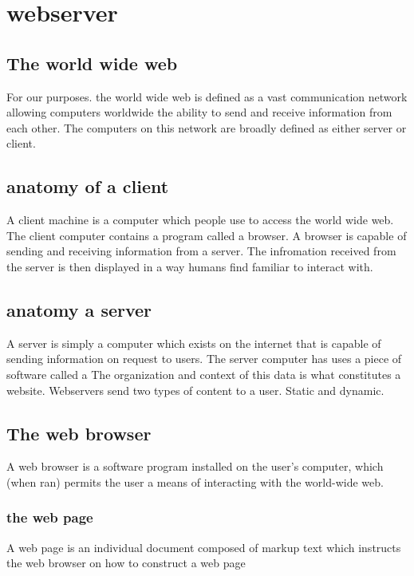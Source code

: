 \section{webserver}

\subsection{The world wide web}

For our purposes. the world wide web is defined as a vast communication network allowing computers worldwide the ability to send and receive information from each other.  The computers on this network are broadly defined as either server or client.

\subsection{anatomy of a client}

A client machine is a computer which people use to access the world wide web.  The client computer contains a program called a browser.  A browser is capable of sending and receiving information from a server.  The infromation received from the server is then displayed in a way humans find familiar to interact with.

\subsection{anatomy a server}

A server is simply a computer which exists on the internet that is capable of sending information on request to users.  The server computer has uses a piece of software called a   The organization and context of this data is what constitutes a website.  Webservers send two types of content to a user.  Static and dynamic.

\subsection{The web browser}

A web browser is a software program installed on the user's computer, which (when ran) permits the user a means of interacting with the world-wide web.  


\subsubsection{the web page}

A web page is an individual document composed of markup text which instructs the web browser on how to construct a web page

